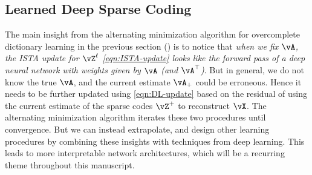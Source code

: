 \documentclass[../../book-main.tex]{subfiles}
\begin{document}
    \subsection{Learned Deep Sparse Coding}
    \label{sec:LISTA}
    The main insight from the alternating minimization algorithm for
    overcomplete dictionary learning in the previous section
    () is to notice that \textit{when we
        fix \(\vA\), the ISTA update for $\vZ^\ell$
        \eqref{eqn:ISTA-update} looks like
        the forward pass of a deep neural network with weights given
        by \(\vA\) (and
    \(\vA^{\top}\))}. But in general, we do not know the true $\vA$,
    and the current
    estimate $\vA_+$ could be erroneous. Hence it needs to be further
    updated using
    \eqref{eqn:DL-update} based on the residual of using the current
    estimate of the
    sparse codes $\vZ^+$ to reconstruct $\vX$. The alternating minimization
    algorithm iterates these two procedures until convergence. But we
    can instead
    extrapolate, and design other learning procedures by combining
    these insights
    with techniques from deep learning. This leads to more interpretable network
    architectures, which will be a recurring theme throughout this manuscript.
\end{document}
